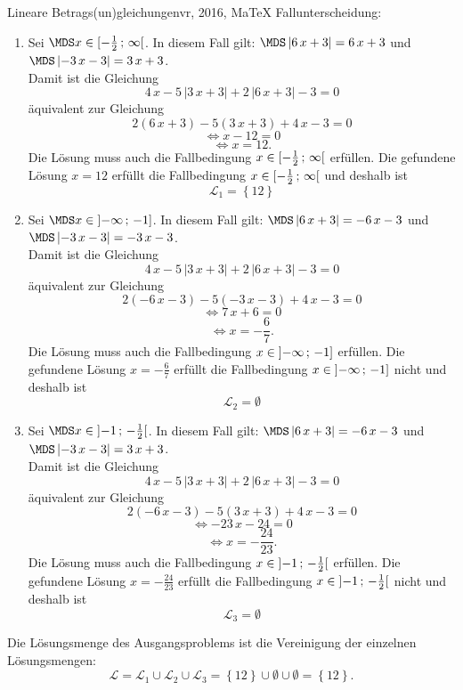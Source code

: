 \begin{MAufgabe}{Lineare Betrags(un)gleichungen}{vr, 2016, MaTeX}
 Fallunterscheidung: 

 \begin{enumerate} 
 \item Sei $ \MDS x\in[ - \frac{1}{2} \, \MIntvlSep \, \infty\MoIr $. 
 In diesem Fall gilt: 
  $ \MDS \left| 6\, x + 3\right|=6\, x + 3$ und $ \MDS \left|  - 3\, x - 3\right|=3\, x + 3$. \\ 
 Damit ist die Gleichung 
 $$ 
4\, x - 5\, \left|3\, x + 3\right| + 2\, \left|6\, x + 3\right| - 3= 0
$$
 \"aquivalent zur Gleichung
 $$ 
2\left(6\, x + 3\right)-5\left( 3\, x + 3\right)+4\, x-3= 0 
$$  
$$ 
 \Leftrightarrow x - 12= 0 
$$  
$$ \Leftrightarrow x = 12 . 
 $$ 
 Die L\"osung muss auch die Fallbedingung $x\in [ - \frac{1}{2} \, ; \, \infty[\mbox{}  $ erf\"ullen. Die gefundene L\"osung $x=12$ erf\"ullt die Fallbedingung  $x\in [ - \frac{1}{2} \, ; \, \infty[\mbox{} $ und deshalb ist  $$
 \mathcal{L}_{1}=\left\{12\right\}
 $$ 
\item Sei $ \MDS x\in\MoIl  -\infty \, \MIntvlSep \, -1]$. 
 In diesem Fall gilt: 
  $ \MDS \left| 6\, x + 3\right|= - 6\, x - 3$ und $ \MDS \left|  - 3\, x - 3\right|= - 3\, x - 3$. \\ 
 Damit ist die Gleichung 
 $$ 
4\, x - 5\, \left|3\, x + 3\right| + 2\, \left|6\, x + 3\right| - 3= 0
$$
 \"aquivalent zur Gleichung
 $$ 
2\left( - 6\, x - 3\right)-5\left(  - 3\, x - 3\right)+4\, x-3= 0 
$$  
$$ 
 \Leftrightarrow 7\, x + 6= 0 
$$  
$$ \Leftrightarrow x = - \frac{6}{7} . 
 $$ 
 Die L\"osung muss auch die Fallbedingung $x\in \mbox{}]\mathopen{}  -\infty \, ; \, -1] $ erf\"ullen. Die gefundene L\"osung $x=- \frac{6}{7}$ erf\"ullt die Fallbedingung  $x\in \mbox{}]\mathopen{}  -\infty \, ; \, -1]$ nicht und deshalb ist  $$
 \mathcal{L}_{2}=\emptyset 
 $$ 
\item Sei $ \MDS x\in\MoIl  -1 \, \MIntvlSep \, - \frac{1}{2}\MoIr $. 
 In diesem Fall gilt: 
  $ \MDS \left| 6\, x + 3\right|= - 6\, x - 3$ und $ \MDS \left|  - 3\, x - 3\right|=3\, x + 3$. \\ 
 Damit ist die Gleichung 
 $$ 
4\, x - 5\, \left|3\, x + 3\right| + 2\, \left|6\, x + 3\right| - 3= 0
$$
 \"aquivalent zur Gleichung
 $$ 
2\left( - 6\, x - 3\right)-5\left( 3\, x + 3\right)+4\, x-3= 0 
$$  
$$ 
 \Leftrightarrow  - 23\, x - 24= 0 
$$  
$$ \Leftrightarrow x = - \frac{24}{23} . 
 $$ 
 Die L\"osung muss auch die Fallbedingung $x\in \mbox{}]\mathopen{}  -1 \, ; \, - \frac{1}{2}[\mbox{}  $ erf\"ullen. Die gefundene L\"osung $x=- \frac{24}{23}$ erf\"ullt die Fallbedingung  $x\in \mbox{}]\mathopen{}  -1 \, ; \, - \frac{1}{2}[\mbox{} $ nicht und deshalb ist  $$
 \mathcal{L}_{3}=\emptyset 
 $$ 
 \end{enumerate} 
  Die L\"osungsmenge des Ausgangsproblems ist die Vereinigung der einzelnen L\"osungsmengen: 
$$ \mathcal{L} = \mathcal{L}_{1} \cup \mathcal{L}_{2} \cup \mathcal{L}_{3} 
 = \left\{12\right\}\cup \emptyset\cup \emptyset 
  =\left\{12\right\} 
   . $$ 
 

\end{MAufgabe}
